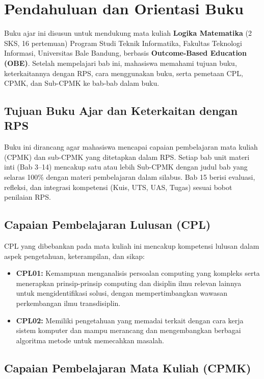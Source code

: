 \documentclass[../main]{subfiles}
\begin{document}
\chapter{Pendahuluan dan Orientasi Buku}

Buku ajar ini disusun untuk mendukung mata kuliah \textbf{Logika Matematika} (2 SKS, 16 pertemuan) Program Studi Teknik Informatika, Fakultas Teknologi Informasi, Universitas Bale Bandung, berbasis \textbf{Outcome-Based Education (OBE)}. Setelah mempelajari bab ini, mahasiswa memahami tujuan buku, keterkaitannya dengan RPS, cara menggunakan buku, serta pemetaan CPL, CPMK, dan Sub-CPMK ke bab-bab dalam buku.

\section*{Tujuan Buku Ajar dan Keterkaitan dengan RPS}

Buku ini dirancang agar mahasiswa mencapai capaian pembelajaran mata kuliah (CPMK) dan sub-CPMK yang ditetapkan dalam RPS. Setiap bab unit materi inti (Bab 3--14) mencakup satu atau lebih Sub-CPMK dengan judul bab yang selaras 100\% dengan materi pembelajaran dalam silabus. Bab 15 berisi evaluasi, refleksi, dan integrasi kompetensi (Kuis, UTS, UAS, Tugas) sesuai bobot penilaian RPS.

\section*{Capaian Pembelajaran Lulusan (CPL)}

CPL yang dibebankan pada mata kuliah ini mencakup kompetensi lulusan dalam aspek pengetahuan, keterampilan, dan sikap:

\begin{itemize}[leftmargin=*]
  \item \textbf{CPL01:} Kemampuan menganalisis persoalan computing yang kompleks serta menerapkan prinsip-prinsip computing dan disiplin ilmu relevan lainnya untuk mengidentifikasi solusi, dengan mempertimbangkan wawasan perkembangan ilmu transdisiplin.
  \item \textbf{CPL02:} Memiliki pengetahuan yang memadai terkait dengan cara kerja sistem komputer dan mampu merancang dan mengembangkan berbagai algoritma metode untuk memecahkan masalah.
\end{itemize}

\section*{Capaian Pembelajaran Mata Kuliah (CPMK)}
\end{document}
